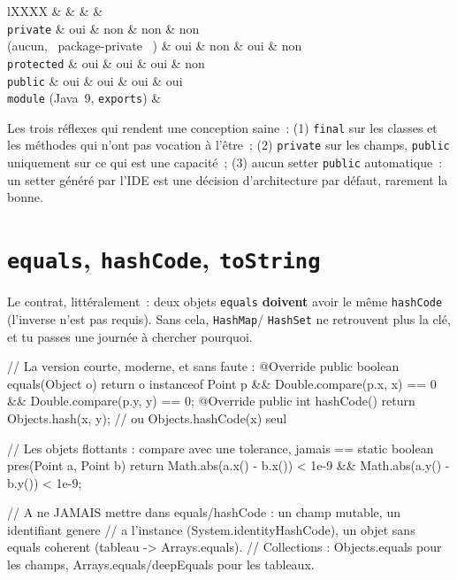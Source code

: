 \begin{tabz}{lXXXX}
  \headrow {} \&  \&  \&  \&  \\
  \midrule
  \verb|private| \& oui \& non \& non \& non \\
  (aucun, \og ~package-private~ \fg{}) \& oui \& non \& oui \& non \\
  \verb|protected| \& oui \& oui \& oui \& non \\
  \verb|public| \& oui \& oui \& oui \& oui \\
  \verb|module| (Java~9, \verb|exports|) \&  \\
\end{tabz}

Les trois r\'eflexes qui rendent une conception saine~: (1) \verb|final| sur les classes et les
m\'ethodes qui n'ont pas vocation \`a l'\^etre~; (2) \verb|private| sur les champs, \verb|public|
uniquement sur ce qui est une capacit\'e~; (3) aucun setter \verb|public| automatique~: un setter
g\'en\'er\'e par l'IDE est une d\'ecision d'architecture par d\'efaut, rarement la bonne.

\section{\texttt{equals}, \texttt{hashCode}, \texttt{toString}}

Le contrat, litt\'eralement~: deux objets \verb|equals| \textbf{doivent} avoir le m\^eme
\verb|hashCode| (l'inverse n'est pas requis). Sans cela, \verb|HashMap|/ \verb|HashSet|
ne retrouvent plus la cl\'e, et tu passes une journ\'ee \`a chercher pourquoi.

\begin{codejava}
// La version courte, moderne, et sans faute :
@Override public boolean equals(Object o) {
    return o instanceof Point p && Double.compare(p.x, x) == 0 && Double.compare(p.y, y) == 0;
}
@Override public int hashCode() { return Objects.hash(x, y); }      // ou Objects.hashCode(x) seul

// Les objets flottants : compare avec une tolerance, jamais ==
static boolean pres(Point a, Point b) {
    return Math.abs(a.x() - b.x()) < 1e-9 && Math.abs(a.y() - b.y()) < 1e-9;
}

// A ne JAMAIS mettre dans equals/hashCode : un champ mutable, un identifiant genere
// a l'instance (System.identityHashCode), un objet sans equals coherent (tableau -> Arrays.equals).
// Collections : Objects.equals pour les champs, Arrays.equals/deepEquals pour les tableaux.
\end{codejava}

